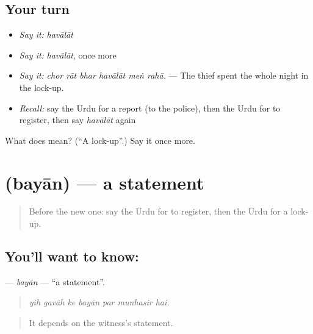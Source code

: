 \subsection*{Your turn}
\begin{itemize}
\raggedright
  \item \emph{Say it:} \emph{havālāt}
  \item \emph{Say it:} \emph{havālāt}, once more
  \item \emph{Say it:} \emph{chor rāt bhar havālāt meṅ rahā.} — The thief spent the whole night in the lock-up.
  \item \emph{Recall:} say the Urdu for a report (to the police), then the Urdu for to register, then say \emph{havālāt} again
\end{itemize}

\begin{tcolorbox}[breakable,colback=teal!4,colframe=teal!35!black,title={Before you move on}]
What does  mean? (\textquotedblleft{}A lock-up\textquotedblright{}.) Say it once more.
\end{tcolorbox}
\section[\texorpdfstring{\ur{بیان} (bayān)}{بیان (bayān)}]{ (bayān) — a statement}

\label{lesson:UR-C278-bayan}



\begin{quote}
Before the new one: say the Urdu for to register, then the Urdu for a lock-up.
\end{quote}

\subsection*{You'll want to know: }
\textbf{} — \emph{bayān} — \textquotedblleft{}a statement\textquotedblright{}.

\begin{quote}
      
\end{quote}

\begin{quote}
\emph{yih gavāh ke bayān par munhasir hai.}
\end{quote}

\begin{quote}
It depends on the witness's statement.
\end{quote}

